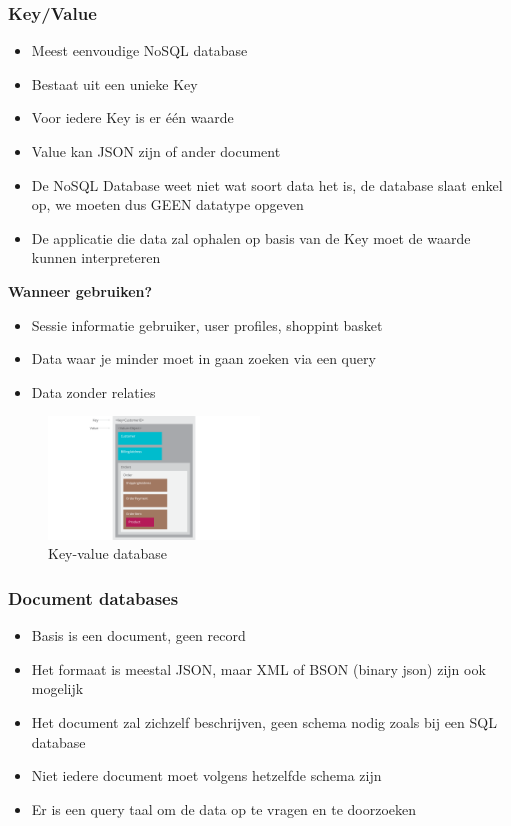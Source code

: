 \documentclass{article}
\newcommand{\bold}[1]{\textbf{#1}}
\begin{document}
\subsubsection{Key/Value}

\begin{itemize}
    \item Meest eenvoudige NoSQL database
    \item Bestaat uit een unieke Key
    \item Voor iedere Key is er één waarde
    \item Value kan JSON zijn of ander document
    \item De NoSQL Database weet niet wat soort data het is, de database slaat enkel op, we moeten dus GEEN datatype opgeven
    \item De applicatie die data zal ophalen op basis van de Key moet de waarde kunnen interpreteren
\end{itemize}

\bold{Wanneer gebruiken?}

\begin{itemize}
    \item Sessie informatie gebruiker, user profiles, shoppint basket
    \item Data waar je minder moet in gaan zoeken via een query
    \item Data zonder relaties
\end{itemize}

\begin{figure}[H]
    \centering
    \includegraphics[width=0.5\textwidth]{key-value.png}
    \caption{Key-value database}
\end{figure}


\subsubsection{Document databases}

\begin{itemize}
    \item Basis is een document, geen record
    \item Het formaat is meestal JSON, maar XML of BSON (binary json) zijn ook mogelijk
    \item Het document zal zichzelf beschrijven, geen schema nodig zoals bij een SQL database
    \item Niet iedere document moet volgens hetzelfde schema zijn
    \item Er is een query taal om de data op te vragen en te doorzoeken
\end{itemize}
\end{document}

